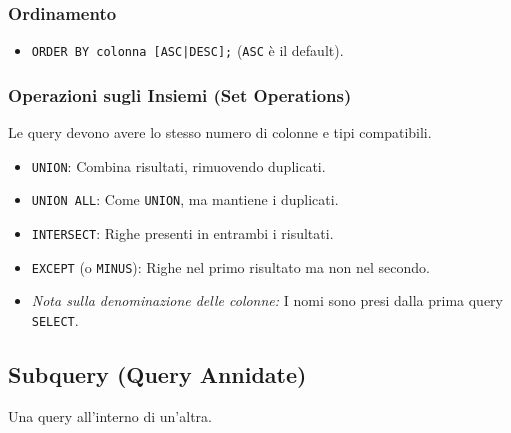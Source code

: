 \subsubsection{Ordinamento}
\begin{itemize}
	\item \texttt{ORDER BY colonna [ASC|DESC];} (\texttt{ASC} è il default).
\end{itemize}

\subsubsection{Operazioni sugli Insiemi (Set Operations)}
Le query devono avere lo stesso numero di colonne e tipi compatibili.
\begin{itemize}
	\item \texttt{UNION}: Combina risultati, rimuovendo duplicati.
	\item \texttt{UNION ALL}: Come \texttt{UNION}, ma mantiene i duplicati.
	\item \texttt{INTERSECT}: Righe presenti in entrambi i risultati.
	\item \texttt{EXCEPT} (o \texttt{MINUS}): Righe nel primo risultato ma non nel secondo.
	\item \textit{Nota sulla denominazione delle colonne:} I nomi sono presi dalla prima query \texttt{SELECT}.
\end{itemize}

\subsection{Subquery (Query Annidate)}
Una query all'interno di un'altra.

